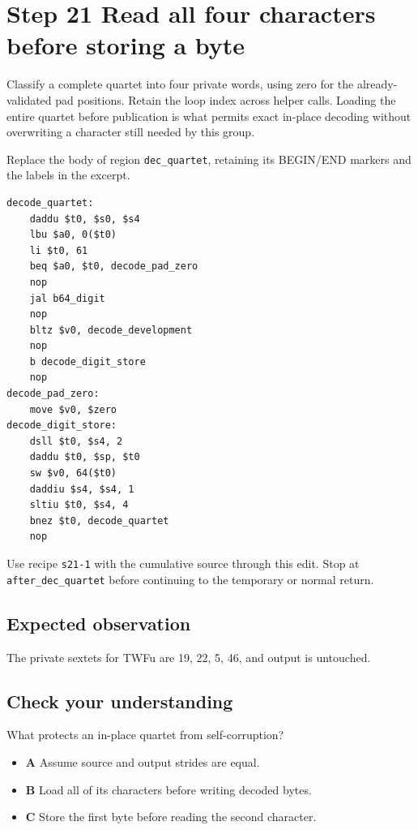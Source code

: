 \section{Step 21 Read all four characters before storing a byte}\label{base64-s21}

Classify a complete quartet into four private words, using zero for the already-validated pad positions. Retain the loop index across helper calls. Loading the entire quartet before publication is what permits exact in-place decoding without overwriting a character still needed by this group.

Replace the body of region \texttt{dec\_quartet}, retaining its BEGIN/END markers and the labels in the excerpt.

\begin{verbatim}
decode_quartet:
    daddu $t0, $s0, $s4
    lbu $a0, 0($t0)
    li $t0, 61
    beq $a0, $t0, decode_pad_zero
    nop
    jal b64_digit
    nop
    bltz $v0, decode_development
    nop
    b decode_digit_store
    nop
decode_pad_zero:
    move $v0, $zero
decode_digit_store:
    dsll $t0, $s4, 2
    daddu $t0, $sp, $t0
    sw $v0, 64($t0)
    daddiu $s4, $s4, 1
    sltiu $t0, $s4, 4
    bnez $t0, decode_quartet
    nop
\end{verbatim}

Use recipe \texttt{s21-1} with the cumulative source through this edit. Stop at \texttt{after\_dec\_quartet} before continuing to the temporary or normal return.

\subsection{Expected observation}
The private sextets for TWFu are 19, 22, 5, 46, and output is untouched.

\subsection{Check your understanding}
What protects an in-place quartet from self-corruption?

\begin{itemize}
  \item \textbf{A} Assume source and output strides are equal.
  \item \textbf{B} Load all of its characters before writing decoded bytes.
  \item \textbf{C} Store the first byte before reading the second character.
\end{itemize}

